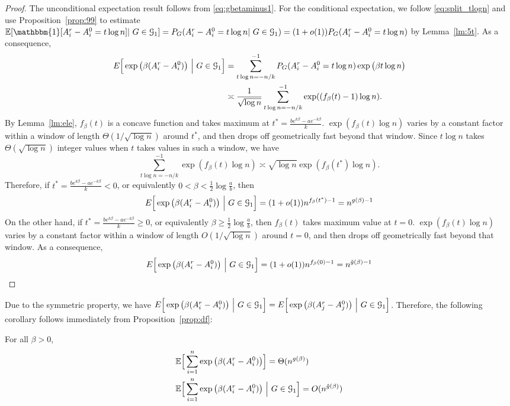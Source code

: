 \documentclass{article}
\begin{document}
\begin{proof}
The unconditional expectation result follows from \eqref{eq:gbetaminus1}.
For the conditional expectation, we follow \eqref{eq:split_tlogn} and use Proposition~\ref{prop:99} to estimate
$\mathbb{E}[\mathbbm{1}[A^r_i - A^0_i = t \log n]|~G\in\cG_1] = P_G(A^r_i - A^0_i = t \log n|~G\in\cG_1) = (1+o(1))P_G(A^r_i - A^0_i = t \log n)$
by Lemma~\ref{lm:5t}.
As a consequence,
\begin{equation}  \label{eq:wf1}
\begin{aligned}
E \Big[\exp\big(\beta (A^r_i-A^0_i) \big) ~\Big|~ G\in\mathcal{G}_1 \Big]
& =  \sum_{t\log n=-n/k}^{-1}
P_G(A^r_i - A^0_i = t \log n)\exp\big(\beta t \log n \big)  \\
& \asymp  \frac{1} {\sqrt{\log n}} \sum_{t\log n=-n/k}^{-1}
 \exp( (f_{\beta}(t) -1)\log n ) .
\end{aligned}
\end{equation}
By Lemma~\ref{lm:ele}, $f_{\beta}(t)$ is a concave function and takes maximum at
$t^\ast=\frac{b e^{k\beta}-a e^{-k\beta}}{k}$. 
$\exp( f_{\beta}(t) \log n)$ varies by a constant factor within a window of length $\Theta(1/\sqrt{\log n})$ around $t^\ast$, and
then drops off geometrically fast beyond that window. Since $t\log n$ takes $\Theta(\sqrt{\log n})$ integer values when $t$ takes values in such a window, we have
\begin{equation} \label{eq:wf2}
\sum_{t\log n=-n/k}^{-1}
 \exp( f_{\beta}(t) \log n )
 \asymp \sqrt{\log n}
 \exp( f_{\beta}(t^\ast) \log n ) .
\end{equation}
Therefore, if $t^\ast=\frac{b e^{k\beta}-a e^{-k\beta}}{k}<0$,
or equivalently $0<\beta<\frac{1}{2}\log\frac{a}{b}$, then
$$
E \Big[\exp\big(\beta (A^r_i-A^0_i) \big) ~\Big|~ G\in\mathcal{G}_1 \Big] = (1+o(1))
n^{f_{\beta}(t^*)-1} = n^{g(\beta)-1}
$$
On the other hand,
if $t^\ast=\frac{b e^{k\beta}-a e^{-k\beta}}{k}\ge 0$, or equivalently $\beta\ge\frac{1}{2}\log\frac{a}{b}$, then
$f_{\beta}(t)$ takes maximum value at $t=0$.
$\exp( f_{\beta}(t) \log n)$ varies by a constant factor within a window of length $O(1/\sqrt{\log n})$ around $t=0$, and
then drops off geometrically fast beyond that window. As a consequence,
\begin{align*}
E \Big[\exp\big(\beta (A^r_i-A^0_i) \big) ~\Big|~ G\in\mathcal{G}_1 \Big] = (1+o(1))
n^{f_{\beta}(0)-1} = n^{\tilde{g}(\beta)-1}
\end{align*}
\end{proof}
Due to the symmetric property, we have
$E \Big[\exp\big(\beta (A^r_i-A^0_i) \big) ~\Big|~ G\in\mathcal{G}_1 \Big] = E \Big[\exp\big(\beta (A^r_j-A^0_j) \big) ~\Big|~ G\in\mathcal{G}_1 \Big]$.
Therefore, the following corollary follows immediately from Proposition~\ref{prop:df}:
\begin{corollary} \label{cr:yy}
For all $\beta>0$,
\begin{align}
& \mathbb{E} \Big[ \sum_{i=1}^n  \exp\big(\beta (A^r_i-A^0_i) \big)  \Big] 
= \Theta(n^{g(\beta)}) \label{eq:ThetaEbeta} \\
& \mathbb{E} \Big[ \sum_{i=1}^n  \exp\big(\beta (A^r_i-A^0_i) \big) ~\Big|~ G\in\mathcal{G}_1 \Big] 
= O(n^{\tilde{g}(\beta)})
\end{align}
\end{corollary}
\end{document}
